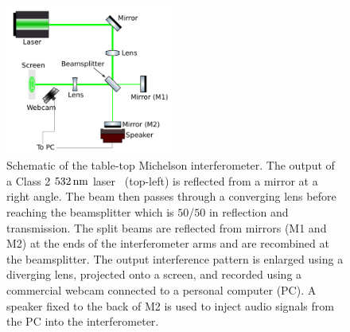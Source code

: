 \documentclass[paper-main.tex]{subfiles}
\begin{document}
\begin{figure}
	\includegraphics[width=0.49\textwidth]{figures/ifo_schematic_webcam_edit.pdf}
	\caption{\label{fig:ifo_schematic_webcam}
Schematic of the table-top Michelson interferometer. 
The output of a Class 2 $532\,{\rm nm}$ laser~\cite{ThorLabsIFO} (top-left) is reflected from a mirror at a right angle. The beam then passes through a converging lens before reaching the beamsplitter which is $50$/$50$ in reflection and transmission. 
The split beams are reflected from mirrors (M1 and M2) at the ends of the interferometer arms and are recombined at the beamsplitter. 
The output interference pattern is enlarged using a diverging lens, projected onto a screen, and recorded using a commercial webcam connected to a personal computer (PC). 
A speaker fixed to the back of M2 is used to inject audio signals from the PC into the interferometer.
    }
\end{figure}
\end{document}
